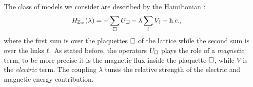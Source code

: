 The class of models we consider are described by the Hamiltonian \cite{tagliacozzo2011entanglement, hamma2008adiabatic, trebst2007topological}:
\begin{equation}
    H_{\mathbb{Z}_N}(\lambda) = - \sum_{\square} U_{\square} - \lambda \sum_{\ell} V_{\ell} + \text{h.c.},
    \label{eq:hamiltonian_base}
\end{equation}
where the first sum is over the plaquettes $\square$ of the lattice while the second sum is over the links $\ell$.
As stated before, the operators $U_{\square}$ plays the role of a \emph{magnetic} term, to be more precise it is the magnetic flux inside the plaquette $\square$, while $V$ is the \emph{electric} term.
The coupling $\lambda$ tunes the relative strength of the electric and magnetic energy contribution.



